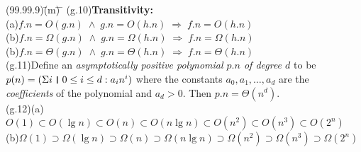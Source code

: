 \documentclass{amsart}
\newcommand{\lgap}{2pt}                             %
\newcommand{\llgap}{6pt}                            %
\newcommand{\impl}{\ensuremath{\Rightarrow}}        %
\newcommand{\thedr}{\rule[-.25ex]{.32mm}{1.75ex}}   %
\newcommand{\dr}{\;\,\thedr\,\;}                    %
\newcommand{\rb}{:}                                 %
\begin{document}
\newpage

\begin{tabbing}
(99.99.9)\;\=(m)\;\= \makebox[2in]{ } \= \kill
(g.10)\>\textbf{Transitivity:}\\[\lgap]
     \>(a)\>$f.n = O(g.n) \;\land\; g.n = O(h.n) \;\impl\; f.n = O(h.n)$\\[\lgap]
     \>(b)\>$f.n = \Omega (g.n) \;\land\; g.n = \Omega (h.n) \;\impl\; f.n = \Omega (h.n)$\\[\lgap]
     \>(b)\>$f.n = \Theta (g.n) \;\land\; g.n = \Theta (h.n) \;\impl\; f.n = \Theta (h.n)$\\[\llgap]
(g.11)\>Define an \emph{asymptotically positive polynomial $p.n$ of degree $d$} to be\\[\lgap]
      \>$p(n) = (\Sigma i\dr 0\le i\le d \rb a_{i}n^{i})$ where the constants $a_{0}, a_{1}, \ldots , a_{d}$ are the\\[\lgap]
      \>\emph{coefficients} of the polynomial and $a_{d} > 0$. Then $p.n = \Theta(n^{d})$.\\[\llgap]
(g.12)\>(a)\>$O (1) \subset O (\lg n) \subset O (n) \subset O (n\lg n) \subset O (n^{2}) \subset O (n^{3}) \subset O (2^{n})$\\[\lgap]
      \>(b)\>$\Omega (1) \supset \Omega (\lg n) \supset \Omega (n) \supset \Omega (n\lg n) \supset \Omega (n^{2}) \supset \Omega (n^{3}) \supset \Omega (2^{n})$\\[\lgap]
\end{tabbing}
\end{document}
